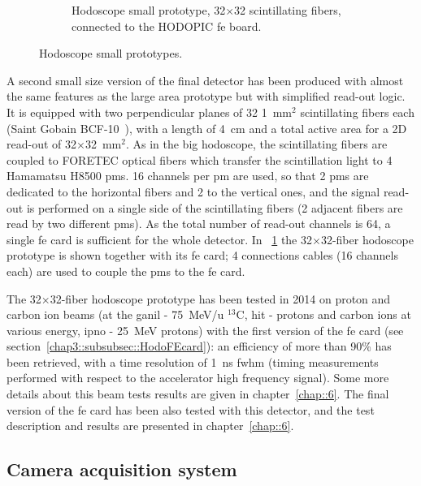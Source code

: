 \begin{figure}
\begin{subfigure}[t]{.5\textwidth}
\caption{Hodoscope small prototype, 32$\times$32 scintillating fibers, connected to the HODOPIC \gls{fe} board.}
\label{chap3::fig::Hodoscope32}
\end{subfigure}
\caption{Hodoscope small prototypes.}
\label{chap3::fig::HodoSmall}
\end{figure}

A second small size version of the final detector has been produced with almost the same features as the large area prototype but with simplified read-out logic. It is equipped with two perpendicular planes of 32 1~mm$^{2}$ scintillating fibers each (Saint Gobain BCF-10~\parencite{SaintGobain2017}), with a length of 4~cm and a total active area for a 2D read-out of 32$\times$32~mm$^{2}$. As in the big hodoscope, the scintillating fibers are coupled to FORETEC optical fibers which transfer the scintillation light to 4 Hamamatsu H8500 \glspl{pm}. 16 channels per \gls{pm} are used, so that 2 \glspl{pm} are dedicated to the horizontal fibers and 2 to the vertical ones, and the signal read-out is performed on a single side of the scintillating fibers (2 adjacent fibers are read by two different \glspl{pm}). As the total number of read-out channels is 64, a single \gls{fe} card is sufficient for the whole detector. In \figurename~\ref{chap3::fig::Hodoscope32} the 32$\times$32-fiber hodoscope prototype is shown together with its \gls{fe} card; 4 connections cables (16 channels each) are used to couple the \glspl{pm} to the \gls{fe} card.

The 32$\times$32-fiber hodoscope prototype has been tested in 2014 on proton and carbon ion beams (at the \gls{ganil} - 75~MeV/u $^{13}$C, \gls{hit} - protons and carbon ions at various energy, \gls{ipno} - 25~MeV protons) with the first version of the \gls{fe} card (see section~\ref{chap3::subsubsec::HodoFEcard}): an efficiency of more than 90\% has been retrieved, with a time resolution of 1~ns \gls{fwhm} (timing measurements performed with respect to the accelerator high frequency signal). Some more details about this beam tests results are given in chapter~\ref{chap::6}. The final version of the \gls{fe} card has been also tested with this detector, and the test description and results are presented in chapter~\ref{chap::6}.  
   


\subsection{Camera acquisition system}\label{chap3::subsec::cameraElectronicsDAQ}

